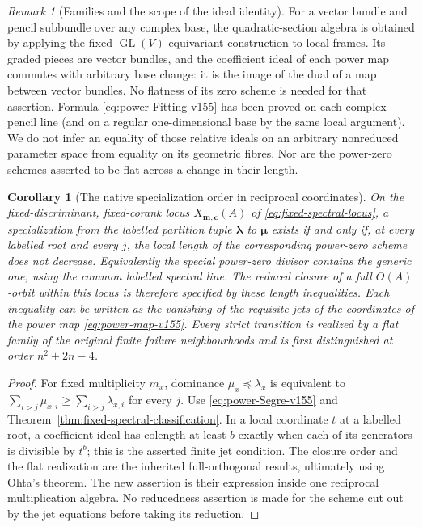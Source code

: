 \documentclass[11pt,reqno]{amsart}
\numberwithin{equation}{section}
\newtheorem{corollary}[theorem]{Corollary}
\theoremstyle{definition}\newtheorem{definition}[theorem]{Definition}
\theoremstyle{remark}\newtheorem{remark}[theorem]{Remark}
\begin{document}
\begin{remark}[Families and the scope of the ideal identity]
\label{rem:power-basechange-v155}
For a vector bundle and pencil subbundle over any complex base,
the quadratic-section algebra is obtained by applying the fixed
$\operatorname{GL}(V)$-equivariant construction to local frames.
Its graded pieces are vector bundles, and the coefficient ideal of
each power map commutes with arbitrary base change: it is the image
of the dual of a map between vector bundles.  No flatness of its
zero scheme is needed for that assertion.  Formula
\eqref{eq:power-Fitting-v155} has been proved on each complex
pencil line (and on a regular one-dimensional base by the same
local argument).  We do not infer an equality of those relative
ideals on an arbitrary nonreduced parameter space from equality
on its geometric fibres.  Nor are the power-zero schemes asserted
to be flat across a change in their length.
\end{remark}

\begin{corollary}[The native specialization order in reciprocal coordinates]
\label{cor:power-order-v155}
On the fixed-discriminant, fixed-corank locus
$X_{\boldsymbol m,\boldsymbol c}(A)$ of
\eqref{eq:fixed-spectral-locus}, a specialization from the labelled
partition tuple $\boldsymbol\lambda$ to $\boldsymbol\mu$ exists
if and only if, at every labelled root and every $j$, the local
length of the corresponding power-zero scheme does not decrease.
Equivalently the special power-zero divisor contains the generic
one, using the common labelled spectral line.
The reduced closure of a full $O(A)$-orbit within this locus is
therefore specified by these length inequalities.  Each inequality
can be written as the vanishing of the requisite jets of the
coordinates of the power map \eqref{eq:power-map-v155}.
Every strict transition is realized by a flat family of the original
finite failure neighbourhoods and is first distinguished at order
$n^2+2n-4$.
\end{corollary}
\begin{proof}
For fixed multiplicity $m_x$, dominance
$\mu_x\preceq\lambda_x$ is equivalent to
$\sum_{i>j}\mu_{x,i}\geq\sum_{i>j}\lambda_{x,i}$ for every $j$.
Use \eqref{eq:power-Segre-v155} and
Theorem~\ref{thm:fixed-spectral-classification}.
In a local coordinate $t$ at a labelled root, a coefficient ideal
has colength at least $b$ exactly when each of its generators is
divisible by $t^b$; this is the asserted finite jet condition.
The closure order and the flat realization are the inherited
full-orthogonal results, ultimately using Ohta's theorem.  The
new assertion is their expression inside one reciprocal
multiplication algebra.  No reducedness assertion is made for the
scheme cut out by the jet equations before taking its reduction.
\end{proof}
\end{document}
